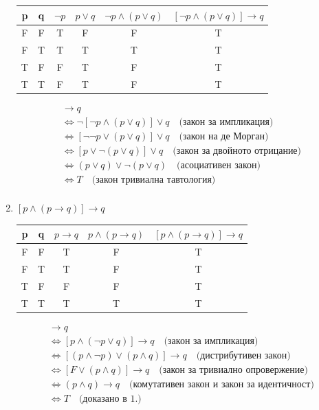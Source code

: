 \documentclass[fleqn, 12pt]{article}
\theoremstyle{definition}
\begin{document}
\begin{enumerate}
\begin{table}[htp]
\begin{center}
\begin{tabular}{|c|c|c|c|c|c|}
\hline
      p & q  & $ \neg p$  & $p \lor q$ & $\neg p \land (p \lor q)$ & $[\neg p \land (p \lor q)] \to q$\\
      \hline
	F & F & T & F &F & T\\
\hline
	F & T & T & T & T &T \\
\hline
	T & F & F  & T & F & T \\
\hline
 	T & T & F  & T & F & T \\
\hline
    \end{tabular}
  \end{center}
\end{table}
\begin{gather*}
[\neg p \land (p \lor q)] \to q \\
\Leftrightarrow \neg [\neg p \land (p \lor q)] \lor q  \quad \text{(закон за импликация)} \\
\Leftrightarrow [\neg \neg p \lor (p \lor q)] \lor q \quad\text{(закон на де Морган)} \\
\Leftrightarrow [ p \lor \neg(p \lor q)] \lor q \quad \text{(закон за двойното отрицание)} \\
\Leftrightarrow  (p \lor q) \lor \neg (p \lor q) \quad \text{(асоциативен закон)} \\
\Leftrightarrow T \quad \text{(закон тривиална тавтология)} \\
\end{gather*}
\item $[p \land (p \to q)] \to q$
\begin{table}[htp]
  \begin{center}
    \begin{tabular}{|c|c|c|c|c|} 
\hline
      p & q  & $ p \to q$  & $p \land (p \to q) $ & $[p \land (p \to q)] \to q$ \\
      \hline
	F & F & T & F &T \\
\hline
	F & T & T & F & T  \\
\hline
	T & F & F  & F & T  \\
\hline
 	T & T & T  & T & T \\
\hline
    \end{tabular}
  \end{center}
\end{table}
\begin{gather*}
[p \land (p \to q)] \to q\\
\Leftrightarrow [p \land (\neg p \lor q)] \to q  \quad \text{(закон за импликация)} \\
\Leftrightarrow [(p \land \neg p) \lor (p \land q)] \to q \quad\text{(дистрибутивен закон)} \\
\Leftrightarrow [F \lor (p \land q)] \to q\quad \text{(закон за тривиално опровержение)} \\
\Leftrightarrow (p \land q) \to q  \quad \text{(комутативен закон и закон за идентичност)} \\
\Leftrightarrow T \quad \text{(доказано в 1.)} \\
\end{gather*}
\end{enumerate}
\end{document}
